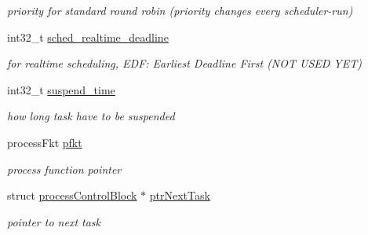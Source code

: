 \begin{CompactItemize}
\begin{CompactList}\small\item\em priority for standard round robin (priority changes every scheduler-run) \item\end{CompactList}\item 
\hypertarget{structprocess_control_block_2b3b876b8030e23294fbce5deba0ac3d}{
int32\_\-t \hyperlink{structprocess_control_block_2b3b876b8030e23294fbce5deba0ac3d}{sched\_\-realtime\_\-deadline}}
\label{structprocess_control_block_2b3b876b8030e23294fbce5deba0ac3d}

\begin{CompactList}\small\item\em for realtime scheduling, EDF: Earliest Deadline First (NOT USED YET) \item\end{CompactList}\item 
\hypertarget{structprocess_control_block_9a4c948bc3150853aa90553bc21f2a23}{
int32\_\-t \hyperlink{structprocess_control_block_9a4c948bc3150853aa90553bc21f2a23}{suspend\_\-time}}
\label{structprocess_control_block_9a4c948bc3150853aa90553bc21f2a23}

\begin{CompactList}\small\item\em how long task have to be suspended \item\end{CompactList}\item 
\hypertarget{structprocess_control_block_a63851f8df2f18c1dd47055e3a77dc76}{
processFkt \hyperlink{structprocess_control_block_a63851f8df2f18c1dd47055e3a77dc76}{pfkt}}
\label{structprocess_control_block_a63851f8df2f18c1dd47055e3a77dc76}

\begin{CompactList}\small\item\em process function pointer \item\end{CompactList}\item 
\hypertarget{structprocess_control_block_90ad408d94361ba70a6871a5dc6dd873}{
struct \hyperlink{structprocess_control_block}{processControlBlock} $\ast$ \hyperlink{structprocess_control_block_90ad408d94361ba70a6871a5dc6dd873}{ptrNextTask}}
\label{structprocess_control_block_90ad408d94361ba70a6871a5dc6dd873}

\begin{CompactList}\small\item\em pointer to next task \item\end{CompactList}\end{CompactItemize}


